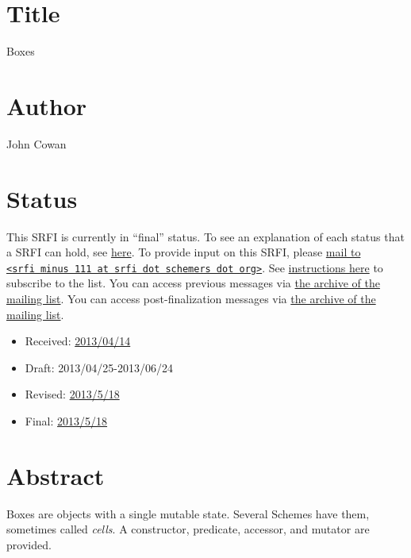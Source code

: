 \section{Title}\label{title}

Boxes

\section{Author}\label{author}

John Cowan

\section{Status}\label{status}

This SRFI is currently in ``final'' status. To see an explanation of
each status that a SRFI can hold, see
\href{http://srfi.schemers.org/srfi-process.html}{here}. To provide
input on this SRFI, please
\href{mailto:srfi\%20minus\%20111\%20at\%20srfi\%20dot\%20schemers\%20dot\%20org}{mail
to
\texttt{\textless{}srfi\ minus\ 111\ at\ srfi\ dot\ schemers\ dot\ org\textgreater{}}}.
See \href{../srfi-list-subscribe.html}{instructions here} to subscribe
to the list. You can access previous messages via
\href{mail-archive/maillist.html}{the archive of the mailing list}. You
can access post-finalization messages via
\href{http://srfi.schemers.org/srfi-111/post-mail-archive/maillist.html}{the
archive of the mailing list}.

\begin{itemize}
\tightlist
\item
  Received:
  \href{http://srfi.schemers.org/srfi-111/srfi-111-1.1.html}{2013/04/14}
\item
  Draft: 2013/04/25-2013/06/24
\item
  Revised:
  \href{http://srfi.schemers.org/srfi-111/srfi-111-1.2.html}{2013/5/18}
\item
  Final:
  \href{http://srfi.schemers.org/srfi-111/srfi-111-1.3.html}{2013/5/18}
\end{itemize}

\section{Abstract}\label{abstract}

Boxes are objects with a single mutable state. Several Schemes have
them, sometimes called \emph{cells}. A constructor, predicate, accessor,
and mutator are provided.

